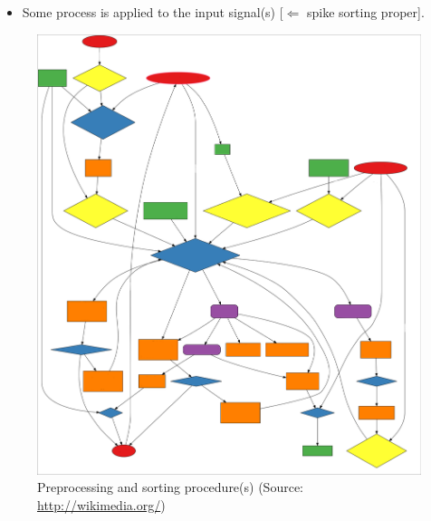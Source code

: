 \documentclass[11pt]{beamer}
\begin{document}
	\begin{frame}
		\begin{itemize}
			\item Some process is applied to the input signal(s) [$\Leftarrow$ spike sorting proper].
		\end{itemize}
		\begin{figure}[p]
			\centering
			\includegraphics[scale=0.05]{images/Workflow_Personendaten_Wartung.png}
			\caption{Preprocessing and sorting procedure(s) (Source: \url{http://wikimedia.org/})}
		\end{figure}
	\end{frame}
\end{document}
